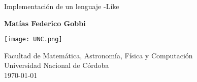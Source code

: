 \begin{titlepage}
    \begin{center}
    
    \vspace*{1cm}
    
    \Huge
    \textbf{\Lenguaje{}}
    
    \vspace{0.5cm}
    
    \Large
    Implementación de un lenguaje \Pascal{}-Like
    
    \vspace{1.5cm}
    
    \textbf{Matías Federico Gobbi}
    
    \vfill
    
    \texttt{[image: UNC.png]}
    
    Facultad de Matemática, Astronomía, Física y Computación
    \\
    Universidad Nacional de Córdoba
    \\
    \today
            
    \end{center}
\end{titlepage}